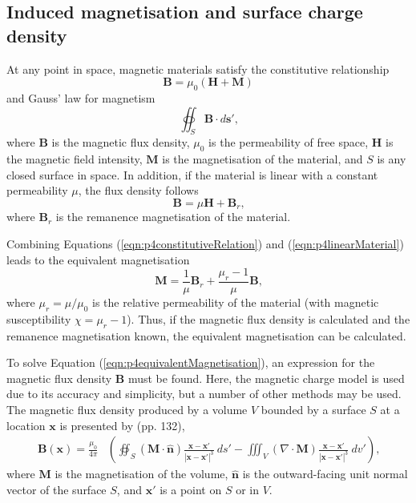 \subsection{Induced magnetisation and surface charge density}
At any point in space, magnetic materials satisfy the constitutive relationship
\begin{equation}\label{eqn:p4constitutiveRelation}
    \mathbf{B} = \mu_0 \left( \mathbf{H} + \mathbf{M} \right)
\end{equation}
and Gauss' law for magnetism
\begin{equation}\label{eqn:p4gaussLawForMagnetism}
    \oiint_S \mathbf{B} \cdot d\mathbf{s}' \text{,}
\end{equation}
where \(\mathbf{B}\) is the magnetic flux density, \(\mu_0\) is the permeability of free space, \(\mathbf{H}\) is the magnetic field intensity, \(\mathbf{M}\) is the magnetisation of the material, and \(S\) is any closed surface in space. In addition, if the material is linear with a constant permeability \(\mu\), the flux density follows
\begin{equation}\label{eqn:p4linearMaterial}
    \mathbf{B} = \mu \mathbf{H} + \mathbf{B}_r \text{,}
\end{equation}
where \(\mathbf{B}_r\) is the remanence magnetisation of the material.

Combining Equations (\ref{eqn:p4constitutiveRelation}) and (\ref{eqn:p4linearMaterial}) leads to the equivalent magnetisation
\begin{equation}\label{eqn:p4equivalentMagnetisation}
    \mathbf{M} = \frac{1}{\mu} \mathbf{B}_r + \frac{\mu_r - 1}{\mu} \mathbf{B} \text{,}
\end{equation}
where \(\mu_r = \mu / \mu_0\) is the relative permeability of the material (with magnetic susceptibility \(\chi = \mu_r - 1\)). Thus, if the magnetic flux density is calculated and the remanence magnetisation known, the equivalent magnetisation can be calculated.

To solve Equation (\ref{eqn:p4equivalentMagnetisation}), an expression for the magnetic flux density \(\mathbf{B}\) must be found. Here, the magnetic charge model is used due to its accuracy and simplicity, but a number of other methods may be used. The magnetic flux density produced by a volume \(V\) bounded by a surface \(S\) at a location \(\mathbf{x}\) is presented by \textcite{Furlani2001} (pp. 132),
\begin{align}\label{eqn:p4chargeModel}
    \mathbf{B}\left( \mathbf{x} \right) = \frac{\mu_0}{4\pi} & \left( \oiint_{S} \left( \mathbf{M} \cdot \hat{\mathbf{n}} \right) \frac{\mathbf{x} - \mathbf{x}'}{\left| \mathbf{x} - \mathbf{x}' \right|^3} \ ds' - \iiint_{V} \left( \nabla \cdot \mathbf{M} \right) \frac{\mathbf{x} - \mathbf{x}'}{\left| \mathbf{x} - \mathbf{x}' \right|^3} \ dv' \right) \text{,}
\end{align}
where \(\mathbf{M}\) is the magnetisation of the volume, \(\hat{\mathbf{n}}\) is the outward-facing unit normal vector of the surface \(S\), and \(\mathbf{x}'\) is a point on \(S\) or in \(V\).

